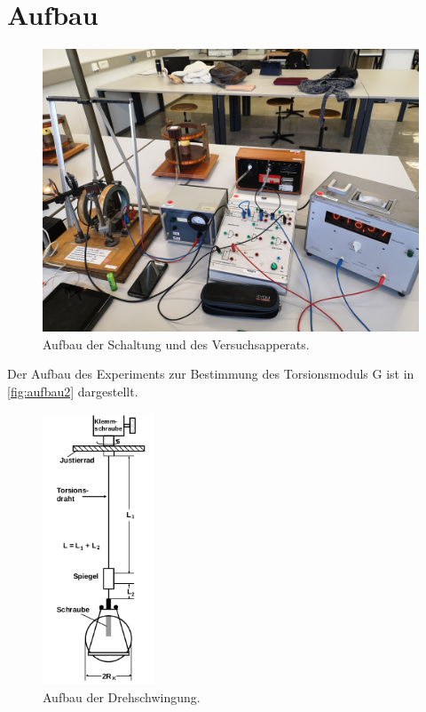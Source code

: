 \newpage
\section{Aufbau}
\label{sec:aufbau}

\begin{figure}
    \centering
    \includegraphics[scale=0.1]{content/Bilder/Aufbau.jpg}
    \caption{Aufbau der Schaltung und des Versuchsapperats.}
    \label{fig:aufbau}
\end{figure}
Der Aufbau des Experiments zur Bestimmung des Torsionsmoduls G ist in \autoref{fig:aufbau2} dargestellt.
\begin{figure}
    \centering
    \includegraphics[width=0.3\textwidth]{content/Bilder/Torsion.png}
    \caption{Aufbau der Drehschwingung.}
    \label{fig:aufbau2}
\end{figure}
